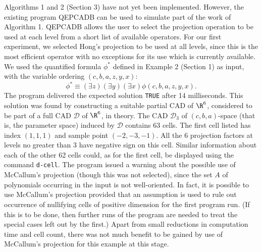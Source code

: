 \documentclass{article}
\begin{document}
Algorithms 1 and 2 (Section 3) have not yet been implemented.
However, the existing program QEPCADB can be used to simulate
part of the work of Algorithm 1.
QEPCADB allows the user to select the projection operation to be used at each level from a short list of available operators.
For our first experiment, we selected Hong's projection to be used at
all levels, since this is the most efficient operator with no exceptions for its use which is currently available.
We used the quantified formula $\phi^*$ defined in Example 2 (Section 1)
as input, with the variable ordering $(c,b,a,z,y,x)$:
\[\phi^* \equiv (\exists z)(\exists y)(\exists x) \phi(c,b,a,z,y,x).\]
The program delivered the expected solution \texttt{TRUE} 
after 14 milliseconds.
This solution was found by constructing a suitable partial CAD of
$\R^6$, considered to be part of a full CAD $\mathcal{D}$
of $\R^6$, in theory.
The CAD $\mathcal{D}_3$ of $(c,b,a)$-space (that is, the parameter space)
induced by $\mathcal{D}$
contains 63 cells. The first cell listed has index $(1,1,1)$
and sample point $(-2, -3, -1)$. All the 6 projection factors at levels
no greater than 3 have negative sign on this cell.
Similar information about each of the other 62 cells could, 
as for the first cell,
be displayed using the command \texttt{d-cell}.
The program issued a warning about the possible use
of McCallum's projection (though this was not selected), since
the set $A$ of polynomials occurring in the input is not well-oriented.
In fact, it is possible to use McCallum's projection provided that
an assumption is used to rule out occurrence of nullifying cells
of positive dimension for the first program run. 
(If this is to be done, then further runs of the program are needed 
to treat the special cases left out by the first.)
Apart from small reductions in computation time and cell count, 
there was not much
benefit to be gained by use of McCallum's projection for this example
at this stage.
\end{document}
